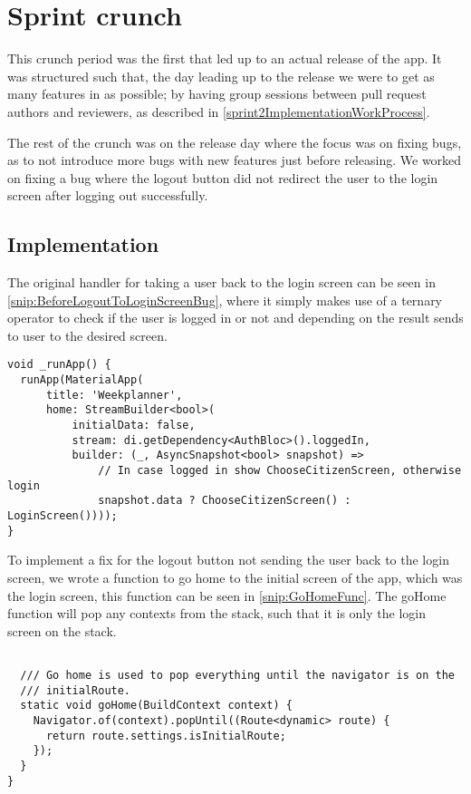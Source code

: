 \section{Sprint crunch}
This crunch period was the first that led up to an actual release of the app.
It was structured such that, the day leading up to the release we were to get as many features in as possible; by having group sessions between pull request authors and reviewers, as described in \autoref{sprint2ImplementationWorkProcess}.

The rest of the crunch was on the release day where the focus was on fixing bugs, as to not introduce more bugs with new features just before releasing. 
We worked on fixing a bug where the logout button did not redirect the user to the login screen after logging out successfully.

\subsection{Implementation}
The original handler for taking a user back to the login screen can be seen in \autoref{snip:BeforeLogoutToLoginScreenBug}, where it simply makes use of a ternary operator to check if the user is logged in or not and depending on the result sends to user to the desired screen.

\begin{lstlisting}[label={snip:BeforeLogoutToLoginScreenBug}, caption={The \_runApp function before the bug fix}, captionpos=b, language=CSharp]
void _runApp() {
  runApp(MaterialApp(
      title: 'Weekplanner',
      home: StreamBuilder<bool>(
          initialData: false,
          stream: di.getDependency<AuthBloc>().loggedIn,
          builder: (_, AsyncSnapshot<bool> snapshot) =>
              // In case logged in show ChooseCitizenScreen, otherwise login
              snapshot.data ? ChooseCitizenScreen() : LoginScreen())));
}
\end{lstlisting}

To implement a fix for the logout button not sending the user back to the login screen, we wrote a function to go home to the initial screen of the app, which was the login screen, this function can be seen in \autoref{snip:GoHomeFunc}.
The goHome function will pop any contexts from the stack, such that it is only the login screen on the stack.

\begin{lstlisting}[label={snip:GoHomeFunc}, caption={The goHome function, which returns to the login screen from anywhere}, captionpos=b, language=CSharp]

  /// Go home is used to pop everything until the navigator is on the
  /// initialRoute.
  static void goHome(BuildContext context) {
    Navigator.of(context).popUntil((Route<dynamic> route) {
      return route.settings.isInitialRoute;
    });
  }
}
\end{lstlisting}

